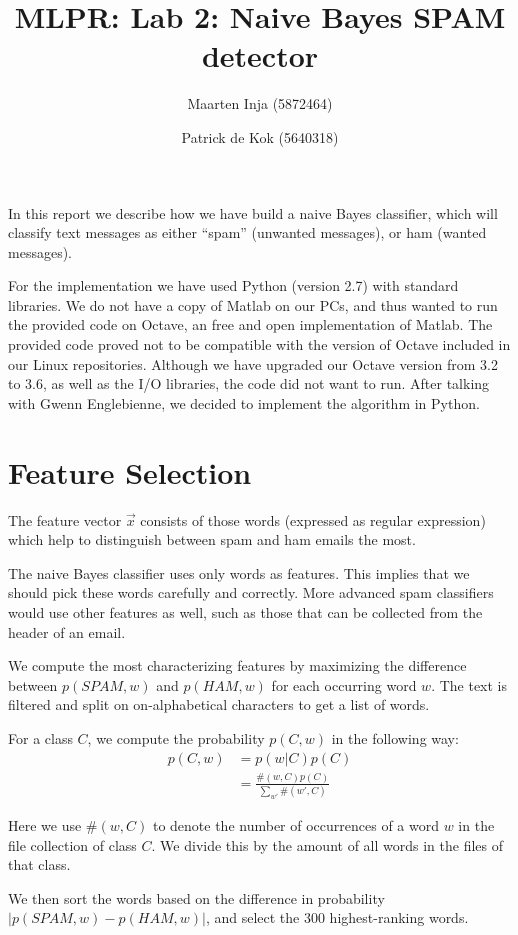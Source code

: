 \documentclass[a4paper,11pt]{article}
\author{Maarten Inja (5872464) \and Patrick de Kok (5640318)}
\title{MLPR: Lab 2: Naive Bayes SPAM detector}
\begin{document}
\maketitle

In this report we describe how we have build a naive Bayes classifier, which will classify text messages as either ``spam'' (unwanted messages), or ham (wanted messages).  

For the implementation we have used Python (version 2.7) with standard libraries.  We do not have a copy of Matlab on our PCs, and thus wanted to run the provided code on Octave, an free and open implementation of Matlab.  The provided code proved not to be compatible with the version of Octave included in our Linux repositories.  Although we have upgraded our Octave version from 3.2 to 3.6, as well as the I/O libraries, the code did not want to run.  After talking with Gwenn Englebienne, we decided to implement the algorithm in Python. 

\section{Feature Selection}
The feature vector $\vec{x}$ consists of those words (expressed as 
regular expression) which 
help to distinguish between spam and ham emails the most.

The naive Bayes classifier uses only words as features. This implies that we should pick these words carefully and correctly. More advanced spam classifiers would use other features as well, such as those that can be collected from the header of an email.

We compute the most characterizing features by maximizing the difference between $p(SPAM, w)$ and $p(HAM, w)$ for each occurring word $w$.  The text is filtered and split on on-alphabetical characters to get a list of words.

For a class $C$, we compute the probability $p(C, w)$ in the following way:
\begin{align*}
  p(C, w) 
    &= p(w | C) p(C) \\
    &= \frac{\#(w, C) p(C)}{\sum_{w'} \#(w', C)}
\end{align*}

Here we use $\#(w, C)$ to denote the number of occurrences of a word $w$ in the file collection of class $C$.  We divide this by the amount of all words in the files of that class.

We then sort the words based on the difference in probability $|p(SPAM, w) - p(HAM, w)|$, and select the 300 highest-ranking words.
\end{document}
